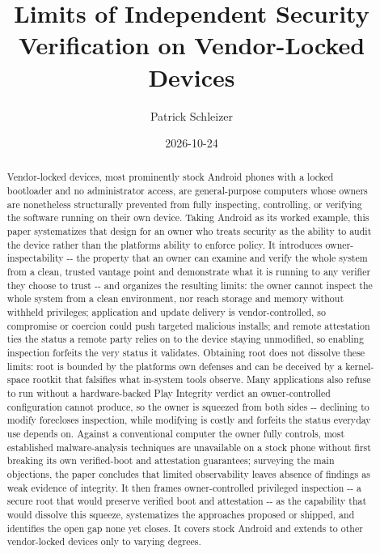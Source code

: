 \documentclass[
]{article}
\title{Limits of Independent Security Verification on Vendor-Locked
Devices}
\author{Patrick Schleizer}
\date{2026-10-24}
\begin{document}
\maketitle
\begin{abstract}
Vendor-locked devices, most prominently stock Android phones with a
locked bootloader and no administrator access, are general-purpose
computers whose owners are nonetheless structurally prevented from fully
inspecting, controlling, or verifying the software running on their own
device. Taking Android as its worked example, this paper systematizes
that design for an owner who treats security as the ability to audit the
device rather than the platform\textquotesingle s ability to enforce
policy. It introduces owner-inspectability -\/- the property that an
owner can examine and verify the whole system from a clean, trusted
vantage point and demonstrate what it is running to any verifier they
choose to trust -\/- and organizes the resulting limits: the owner
cannot inspect the whole system from a clean environment, nor reach
storage and memory without withheld privileges; application and update
delivery is vendor-controlled, so compromise or coercion could push
targeted malicious installs; and remote attestation ties the status a
remote party relies on to the device staying unmodified, so enabling
inspection forfeits the very status it validates. Obtaining root does
not dissolve these limits: root is bounded by the
platform\textquotesingle s own defenses and can be deceived by a
kernel-space rootkit that falsifies what in-system tools observe. Many
applications also refuse to run without a hardware-backed Play Integrity
verdict an owner-controlled configuration cannot produce, so the owner
is squeezed from both sides -\/- declining to modify forecloses
inspection, while modifying is costly and forfeits the status everyday
use depends on. Against a conventional computer the owner fully
controls, most established malware-analysis techniques are unavailable
on a stock phone without first breaking its own verified-boot and
attestation guarantees; surveying the main objections, the paper
concludes that limited observability leaves absence of findings as weak
evidence of integrity. It then frames owner-controlled privileged
inspection -\/- a secure root that would preserve verified boot and
attestation -\/- as the capability that would dissolve this squeeze,
systematizes the approaches proposed or shipped, and identifies the open
gap none yet closes. It covers stock Android and extends to other
vendor-locked devices only to varying degrees.
\end{abstract}
\end{document}
